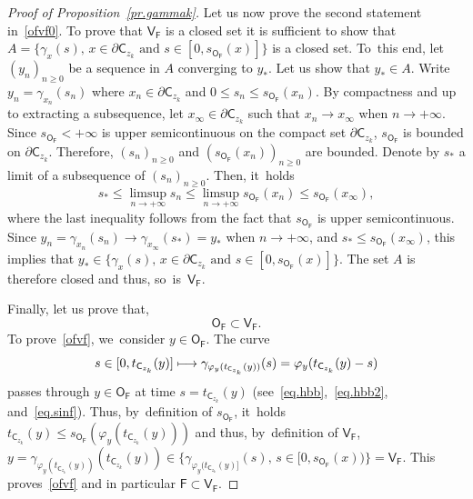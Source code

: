 \documentclass[10pt]{amsart}
\newcommand\mto{\mathchoice{\longmapsto}{\mapsto}{\mapsto}{\mapsto}}
\let\pa\partial
\theoremstyle{plain}
\theoremstyle{definition}
\begin{document}
\begin{proof}[Proof of Proposition~\ref{pr.gammak}]
Let us now prove the second statement in~\eqref{ofvf0}. To prove that $\mathsf V_{\mathsf F}$ is a closed set it is sufficient to show that $A= \big \{ \gamma_x(s), \, x\in \pa \mathsf C_{z_k} \text{ and } s\in [0,s_{\mathsf O_{\mathsf F}}(x)]\big \}$ is a closed set. To~this end, let $(y_n)_{n\ge 0}$ be a sequence in $A$ converging to $y_*$. Let us show that $y_*\in A$. Write $y_n=\gamma_{x_n}(s_n)$ where $x_n \in \pa { \mathsf C_{z_k}}$ and $0\le s_n\le s_{\mathsf O_{\mathsf F}}(x_n)$. By compactness and up to extracting a subsequence, let $x_{\infty}\in \pa { \mathsf C_{z_k}}$ such that $x_n\to x_{\infty}$ when $n\to +\infty$. Since $s_{\mathsf O_{\mathsf F}}<+\infty$ is upper semicontinuous on the compact set $\pa \mathsf C_{z_k}$, $s_{\mathsf O_{\mathsf F}}$ is bounded on $\pa \mathsf C_{z_k}$. Therefore, $(s_n)_{n\ge 0}$ and $(s_{\mathsf O_{\mathsf F}}(x_n))_{n\ge 0}$ are bounded. Denote by $s_{*}$ a limit of a subsequence of $(s_n)_{n\ge 0}$. Then, it~holds
\[
s_*\le \limsup_{n\to +\infty }s_n \le \limsup_{n\to +\infty }s_{\mathsf O_{\mathsf F}}(x_n) \le s_{\mathsf O_{\mathsf F}}(x_{\infty}),
\]
where the last inequality follows from the fact that $s_{\mathsf
O_{\mathsf F}}$ is upper semicontinuous. Since $y_n=
\gamma_{x_n}(s_n)\to \gamma_{x_{\infty}}(s_*)=y_*$ when $n\to
+\infty$, and $s_*\le s_{\mathsf O_{\mathsf F}}(x_{\infty})$, this
implies that $y_*\in \big \{ \gamma_x(s), \, x\in \pa \mathsf C_{z_k}
\text{ and } s\in [0,s_{\mathsf O_{\mathsf F}}(x)]\big \}$. The set
$A$ is therefore closed and thus, so~is~$\mathsf V_{\mathsf F}$.

Finally, let us prove that,
\begin{equation}\label{ofvf}
{\mathsf O_{\mathsf F}}\subset \mathsf V_{\mathsf F}.
\end{equation}
To prove~\eqref{ofvf}, we~consider $y\in \mathsf O_{\mathsf F}$.
The curve
\[
s\in [0,t_{\mathsf C_{z_k}}(y)] \mto \gamma_{\varphi_y(t_{\mathsf C_{z_k}}(y))}(s)= \varphi_y(t_{\mathsf C_{z_k}}(y)-s)
\]
passes through $y\in \mathsf O_{\mathsf F}$ at time $s=t_{\mathsf C_{z_k}}(y)$ (see~\eqref{eq.hbb},~\eqref{eq.hbb2}, and~\eqref{eq.sinf}). Thus, by~definition of $s_{\mathsf O_{\mathsf F}}$, it~holds $t_{\mathsf C_{z_k}}(y)\le s_{\mathsf O_{\mathsf F}}(\varphi_y(t_{\mathsf C_{z_k}}(y)))$ and thus, by~definition of $\mathsf V_{\mathsf F}$,
$y=\gamma_{\varphi_y(t_{\mathsf C_{z_k}}(y))}(t_{\mathsf C_{z_k}}(y))\in \{ \gamma_{\varphi_y(t_{\mathsf C_{z_k}}(y)]}(s),\, s \in [0,s_{\mathsf O_{\mathsf F}}(x))\}= \mathsf V_{\mathsf F}$.
This proves~\eqref{ofvf} and in particular $\mathsf F\subset\mathsf V_{\mathsf F}$.


\end{proof}
\end{document}
